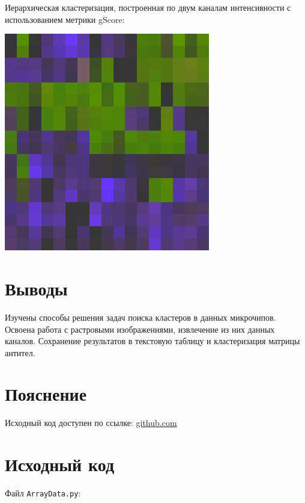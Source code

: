 \documentclass{article} %
\begin{document}
\clearpage
Иерархическая кластеризация,
построенная по двум каналам
интенсивности с использованием
метрики gScore:
\bigskip

\includegraphics{im-12.png}

\clearpage
\section{Выводы}
Изучены способы решения задач поиска кластеров
в данных микрочипов.
Освоена работа с растровыми изображениями,
извлечение из них данных каналов.
Сохранение результатов в текстовую таблицу
и кластеризация матрицы антител.

\section{Пояснение}
Исходный код доступен по ссылке:
\href{https://github.com/SvichkarevAnatoly/Course-Python-Bioinformatics/tree/master/semester2/task3}
{github.com}

\section{Исходный код}
Файл \verb$ArrayData.py$:

\end{document}
